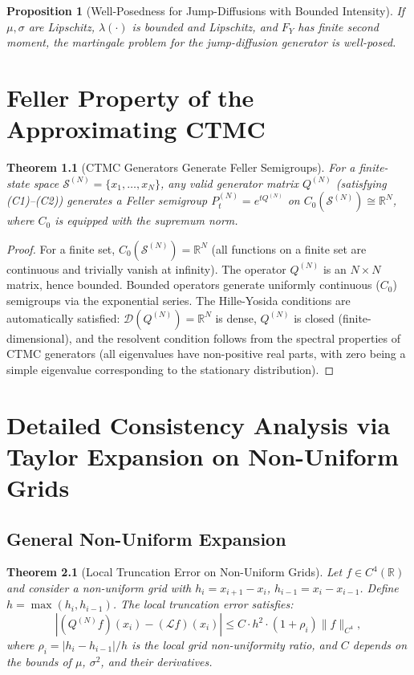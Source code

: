 \documentclass[11pt,a4paper,openany]{book}
\theoremstyle{definition}
\theoremstyle{plain}
\newtheorem{theorem}{Theorem}[chapter]
\newtheorem{proposition}[theorem]{Proposition}
\theoremstyle{remark}
\newcommand{\1}{\mathbbm{1}}
\newcommand{\R}{\mathbb{R}}
\newcommand{\calL}{\mathcal{L}}
\newcommand{\calD}{\mathcal{D}}
\newcommand{\calS}{\mathcal{S}}
\begin{document}
\begin{proposition}[Well-Posedness for Jump-Diffusions with Bounded Intensity]
If $\mu, \sigma$ are Lipschitz, $\lambda(\cdot)$ is bounded and Lipschitz, and $F_{Y}$ has finite second moment, the martingale problem for the jump-diffusion generator is well-posed.
\end{proposition}

\chapter{Feller Property of the Approximating CTMC}

\begin{theorem}[CTMC Generators Generate Feller Semigroups]
For a finite-state space $\calS^{(N)} = \{x_{1}, \ldots, x_{N}\}$, any valid generator matrix $Q^{(N)}$ (satisfying (C1)--(C2)) generates a Feller semigroup $P_{t}^{(N)} = e^{t Q^{(N)}}$ on $C_{0}(\calS^{(N)}) \cong \R^{N}$, where $C_{0}$ is equipped with the supremum norm.
\end{theorem}

\begin{proof}
For a finite set, $C_{0}(\calS^{(N)}) = \R^{N}$ (all functions on a finite set are continuous and trivially vanish at infinity). The operator $Q^{(N)}$ is an $N \times N$ matrix, hence bounded. Bounded operators generate uniformly continuous ($C_{0}$) semigroups via the exponential series. The Hille-Yosida conditions are automatically satisfied: $\calD(Q^{(N)}) = \R^{N}$ is dense, $Q^{(N)}$ is closed (finite-dimensional), and the resolvent condition follows from the spectral properties of CTMC generators (all eigenvalues have non-positive real parts, with zero being a simple eigenvalue corresponding to the stationary distribution).
\end{proof}

\chapter{Detailed Consistency Analysis via Taylor Expansion on Non-Uniform Grids}
\label{app:consistency}

\section{General Non-Uniform Expansion}

\begin{theorem}[Local Truncation Error on Non-Uniform Grids]
Let $f \in C^{4}(\R)$ and consider a non-uniform grid with $h_{i} = x_{i+1} - x_{i}$, $h_{i-1} = x_{i} - x_{i-1}$. Define $h = \max(h_{i}, h_{i-1})$. The local truncation error satisfies:
\[
|(Q^{(N)} f)(x_{i}) - (\calL f)(x_{i})| \leq C \cdot h^{2} \cdot (1 + \rho_{i}) \|f\|_{C^{4}},
\]
where $\rho_{i} = |h_{i} - h_{i-1}| / h$ is the local grid non-uniformity ratio, and $C$ depends on the bounds of $\mu$, $\sigma^{2}$, and their derivatives.
\end{theorem}
\end{document}
